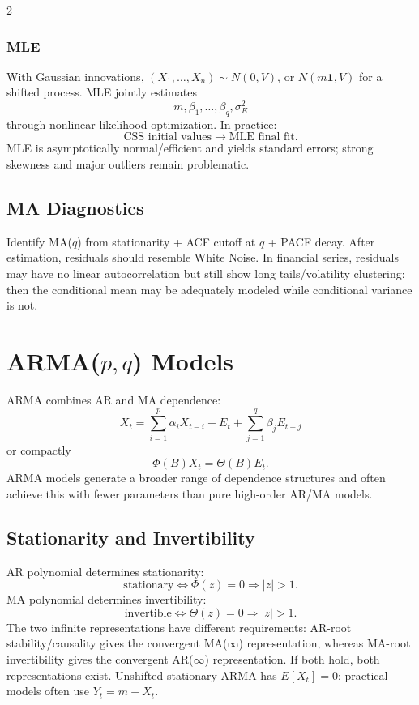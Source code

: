 \documentclass[9pt,a4paper]{extarticle}
\begin{document}
\begin{multicols}{2}
\subsubsection*{MLE}

With Gaussian innovations, \((X_1,\ldots,X_n)\sim N(0,V)\), or \(N(m\mathbf1,V)\) for a shifted process. MLE jointly estimates
\[
m,\beta_1,\ldots,\beta_q,\sigma_E^2
\]
through nonlinear likelihood optimization. In practice:
\[
\boxed{\text{CSS initial values}\rightarrow\text{MLE final fit}.}
\]
MLE is asymptotically normal/efficient and yields standard errors; strong skewness and major outliers remain problematic.

\subsection{MA Diagnostics}

Identify MA($q$) from stationarity + ACF cutoff at \(q\) + PACF decay. After estimation, residuals should resemble White Noise. In financial series, residuals may have no linear autocorrelation but still show long tails/volatility clustering: then the conditional mean may be adequately modeled while conditional variance is not.

\section{ARMA($p,q$) Models}

ARMA combines AR and MA dependence:
\[
\boxed{
X_t=\sum_{i=1}^p\alpha_iX_{t-i}
+E_t+\sum_{j=1}^q\beta_jE_{t-j}
}
\]
or compactly
\[
\boxed{\Phi(B)X_t=\Theta(B)E_t}.
\]
ARMA models generate a broader range of dependence structures and often achieve this with fewer parameters than pure high-order AR/MA models.

\subsection{Stationarity and Invertibility}

AR polynomial determines stationarity:
\[
\boxed{\text{stationary}\iff
\Phi(z)=0\Rightarrow|z|>1.}
\]
MA polynomial determines invertibility:
\[
\boxed{\text{invertible}\iff
\Theta(z)=0\Rightarrow|z|>1.}
\]
The two infinite representations have different requirements: AR-root stability/causality gives the convergent MA($\infty$) representation, whereas MA-root invertibility gives the convergent AR($\infty$) representation. If both hold, both representations exist. Unshifted stationary ARMA has \(E[X_t]=0\); practical models often use \(Y_t=m+X_t\).


\end{multicols}
\end{document}
